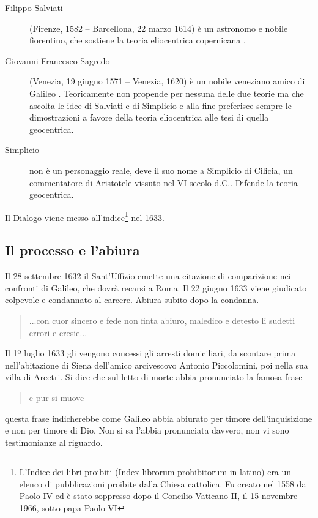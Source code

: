 \documentclass[a4paper]{scrartcl}
\begin{document}
\begin{description}
	\item [Filippo Salviati] (Firenze, 1582 – Barcellona, 22 marzo 1614) è un astronomo e nobile fiorentino, che sostiene la teoria eliocentrica copernicana \autocite{wiki:salviati}.
	\item [Giovanni Francesco Sagredo]  (Venezia, 19 giugno 1571 – Venezia, 1620) è un nobile veneziano amico di Galileo \autocite{wiki:sagredo}. Teoricamente non propende per nessuna delle due teorie ma che ascolta le idee di Salviati e di Simplicio e alla fine preferisce sempre le dimostrazioni a favore della teoria eliocentrica alle tesi di quella geocentrica.
	\item [Simplicio] non è un  personaggio reale, deve il suo nome a Simplicio di Cilicia, un commentatore di Aristotele vissuto nel VI secolo d.C.. Difende la teoria geocentrica.
\end{description}

Il Dialogo viene messo all'indice\footnote{L'Indice dei libri proibiti (Index librorum prohibitorum in latino) era un elenco di pubblicazioni proibite dalla Chiesa cattolica. Fu creato nel 1558 da Paolo IV ed è stato soppresso dopo il Concilio Vaticano II, il 15 novembre 1966, sotto papa Paolo VI} nel 1633.


\subsection{Il processo e l'abiura}

Il 28 settembre 1632 il Sant'Uffizio emette una citazione di comparizione nei confronti di Galileo, che dovrà recarsi a Roma.
Il 22 giugno 1633 viene giudicato colpevole e condannato al carcere.
Abiura subito dopo la condanna.
\begin{quote}
	...con cuor sincero e fede non finta abiuro, maledico e detesto li sudetti errori e eresie...
\end{quote}
Il 1º luglio 1633 gli vengono concessi gli arresti domiciliari, da scontare prima nell'abitazione di Siena dell'amico arcivescovo Antonio Piccolomini, poi nella sua villa di Arcetri.
Si dice che sul letto di morte abbia pronunciato la famosa frase
\begin{quote}
	e pur si muove
\end{quote} 
questa frase indicherebbe come Galileo abbia abiurato per timore dell'in\-qui\-si\-zio\-ne e non per timore di Dio. Non si sa l'abbia pronunciata davvero, non vi sono testimonianze al riguardo.
\end{document}
